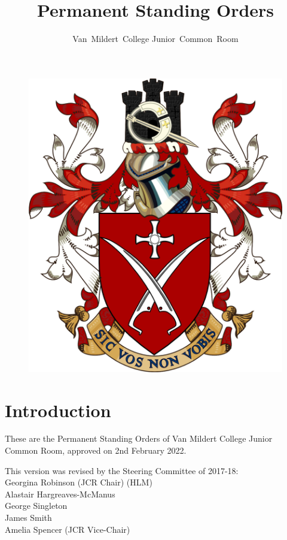 \documentclass[12pt]{article}
\title{Permanent Standing Orders}
\author{Van~Mildert~College Junior~Common~Room}
\date{\thedate}
\newcommand{\thedate}{2nd February 2022}
\begin{document}
\begin{titlepage}  %
    \maketitle
    \begin{figure}[h]
    \includegraphics[scale=0.25]{arms}  %
    \centering
    \end{figure}
    \thispagestyle{empty}
\end{titlepage}

\setcounter{page}{2}  %
\section*{Introduction}
These are the Permanent Standing Orders of Van Mildert College Junior Common Room, approved on \thedate.

This version was revised by the Steering Committee of 2017-18:\\
\hspace*{2cm}Georgina Robinson (JCR Chair) (HLM)\\
\hspace*{2cm}Alastair Hargreaves-McManus\\
\hspace*{2cm}George Singleton\\
\hspace*{2cm}James Smith\\
\hspace*{2cm}Amelia Spencer (JCR Vice-Chair)
\end{document}
